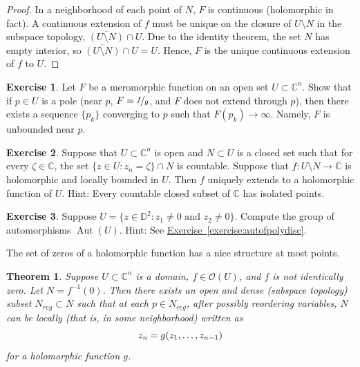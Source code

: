 \documentclass[12pt,openany]{book}
\newcommand{\avoidbreak}{\postdisplaypenalty=100}
\newcommand{\Aut}{\operatorname{Aut}}
\newcommand{\C}{{\mathbb{C}}}
\newcommand{\D}{{\mathbb{D}}}
\newcommand{\sO}{{\mathscr{O}}}
\theoremstyle{plain}
\newtheorem{thm}{Theorem}[section]
\theoremstyle{remark}
\theoremstyle{definition}
\newenvironment{exbox}{%
    \def\FrameCommand{\vrule width 1pt \relax\hspace{10pt}}%
    \MakeFramed{\advance\hsize-\width\FrameRestore}%
}{%
    \endMakeFramed
}
\theoremstyle{exercise}
\newtheorem{exercise}{Exercise}[section]
\theoremstyle{example}
\newcommand{\exerciseref}[1]{\hyperref[#1]{Exercise~\ref*{#1}}}
\begin{document}
\begin{proof}
In a neighborhood of each point of $N$,
$F$ is continuous
(holomorphic in fact).
A continuous extension of $f$ must be unique
on the closure of
$U \setminus N$ in the subspace topology,
$\overline{(U \setminus N)} \cap U$.
Due to the identity theorem, the set $N$ has empty interior,
so $\overline{(U \setminus N)} \cap U = U$.  Hence, $F$ is the unique
continuous extension of $f$ to $U$.
\end{proof}

\begin{exbox}
\begin{exercise}
Let $F$ be a meromorphic function on an open set $U \subset \C^n$.  Show
that if $p \in U$ is a pole (near $p$, $F=\nicefrac{f}{g}$, and $F$ does not
extend through $p$), then there exists a sequence $\{ p_k \}$
converging to $p$ such that $F(p_k) \to \infty$.  Namely, $F$ is
unbounded near $p$.
\end{exercise}

\begin{exercise}
Suppose that $U \subset \C^n$ is open and $N \subset U$ is a closed set
such that for every $\zeta \in \C$, the set
$\{ z \in U : z_n = \zeta \} \cap N$ is countable.
Suppose that $f \colon U \setminus N \to \C$ is holomorphic and
locally bounded in $U$.  Then $f$ uniquely extends to a holomorphic function
of $U$.  Hint: Every countable closed subset of $\C$ has isolated points.
\end{exercise}

\begin{exercise}
Suppose $U = \{ z \in \D^2 : z_1 \not=0 \text{ and } z_2 \not= 0 \}$.
Compute the group of automorphisms $\Aut(U)$.
Hint: See \exerciseref{exercise:autofpolydisc}.
\end{exercise}
\end{exbox}

The set of zeros of a holomorphic function has a nice structure at most
points.

\begin{thm} \label{thm:regptsdense}
Suppose $U \subset \C^n$ is a domain,
$f \in \sO(U)$, and $f$ is not identically zero.
Let $N = f^{-1}(0)$.
Then there exists an open and dense
(subspace topology) subset
$N_{\mathit{reg}} \subset N$
such that at each $p \in N_{\mathit{reg}}$, after possibly reordering variables,
$N$ can be locally (that is, in some neighborhood) written as
\begin{equation*}
z_n = g(z_1,\ldots,z_{n-1})
\avoidbreak
\end{equation*}
for a holomorphic function $g$.
\end{thm}
\end{document}
